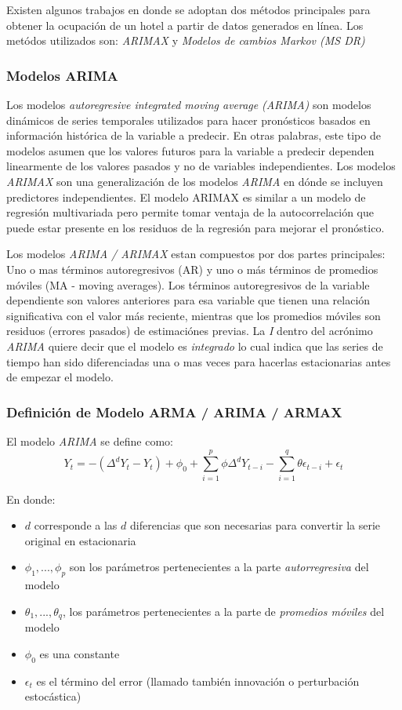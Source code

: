 {Existen algunos trabajos en donde se adoptan dos métodos principales para obtener la ocupación de un hotel a partir de datos generados en línea. Los metódos utilizados son: \emph{ARIMAX} y \emph{Modelos de cambios Markov (MS DR)}

\subsubsection*{Modelos ARIMA}

Los modelos \emph{autoregresive integrated moving average} \emph{(ARIMA)} son modelos dinámicos de series temporales utilizados para hacer pronósticos basados en información histórica de la variable a predecir. En otras palabras, este tipo de modelos asumen que los valores futuros para la variable a predecir dependen linearmente de los valores pasados y no de variables independientes. Los modelos \emph{ARIMAX} son una generalización de los modelos \emph{ARIMA} en dónde se incluyen predictores independientes. El modelo ARIMAX es similar a un modelo de regresión multivariada pero permite tomar ventaja de la autocorrelación que puede estar presente en los residuos de la regresión para mejorar el pronóstico. 

Los modelos \emph{ARIMA / ARIMAX} estan compuestos por dos partes principales: Uno o mas términos autoregresivos (AR) y uno o más términos de promedios móviles (MA - moving averages). Los términos autoregresivos de la variable dependiente son valores anteriores para esa variable que tienen una relación significativa con el valor más reciente, mientras que los promedios móviles son residuos (errores pasados) de estimaciónes previas. La \emph{I} dentro del acrónimo \emph{ARIMA} quiere decir que el modelo es \emph{integrado} lo cual indica que las series de tiempo han sido diferenciadas una o mas veces para hacerlas estacionarias antes de empezar el modelo.
\subsubsection*{Definición de Modelo ARMA / ARIMA / ARMAX}

El modelo \emph{ARIMA} se define como: $$Y_t = -(\Delta^d Y_t - Y_t) + \phi_0 + \sum_{i=1}^p \phi \Delta^d Y_{t-i} - \sum_{i=1}^q \theta \epsilon_{t-i} + \epsilon_t$$

En donde:
\begin{itemize}
  \item $d$ corresponde a las $d$ diferencias que son necesarias para convertir la serie original en estacionaria
  \item $\phi_1 ,..., \phi_p$ son los parámetros pertenecientes a la parte \emph{autorregresiva} del modelo
  \item $\theta_1 ,..., \theta_q$, los parámetros pertenecientes a la parte de \emph{promedios móviles} del modelo
  \item $\phi_0$ es una constante
  \item $\epsilon_t$ es el término del error (llamado también innovación o perturbación estocástica)
\end{itemize}

}
